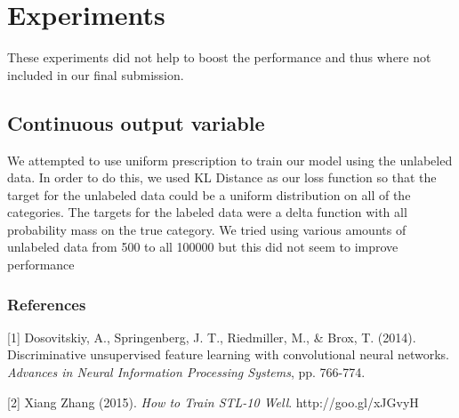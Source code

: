 \documentclass{article} %
\begin{document}
\section{Experiments}

These experiments did not help to boost the performance and thus where not included in our final submission.

\subsection{Continuous output variable}
We attempted to use uniform prescription to train our model using the unlabeled data. In order to 
do this, we used KL Distance as our loss function so that the target for the unlabeled data could be
a uniform distribution on all of the categories. The targets for the labeled data were a delta function
with all probability mass on the true category. We tried using various amounts of unlabeled data from
500 to all 100000 but this did not seem to improve performance


\subsubsection*{References}

\small{
[1] Dosovitskiy, A., Springenberg, J. T., Riedmiller, M., \& Brox, T. (2014). Discriminative unsupervised feature learning with convolutional neural networks. {\it Advances in Neural Information Processing Systems}, pp. 766-774.

[2] Xiang Zhang (2015). {\it How to Train STL-10 Well}. http://goo.gl/xJGvyH
}
\end{document}
